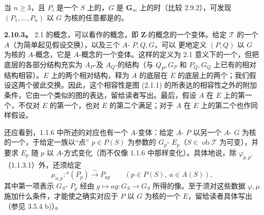 当 $n\geq3$，且 $P_i$ 是一个 $S$ 上的，$G$ 是 $\mathbf G_m$ 上的时（比较 2.9.2），可发现 $(P_1,\ldots,P_n)$ 以 $G$ 为核的任意都是的。

\textbf{2.10.3。} 2.1 的概念，可以看作的概念，即 $\mathbf Z$-的概念的一个变体。给定 $\mathcal T$ 的一个 $A$（为简单起见假设交换），以及三个 $A$- $P,Q,G$，可以
更地定义 $(P,Q)$ 以 $G$ 为核的 $A$-概念，它是 $A$-概念的一个变体。这样的定义为 2.1 意义下的一个，但把底层的各部分结构充实为 $A_P$-及 $A_Q$-的结构（与 $Q_P,G_P$ 和 $P_Q,G_Q$ 上已有的相对结构相容）。$E$ 上的两个相对结构，释为 $A$ 的底层在 $E$ 的底层上的两个；我们假设这两个彼此交换。因此，这个相容性是图 (2.1.1) 的所表达的相容性之外的附加条件，它由一个类似的图的表达，留给读者写出。最后，假设 $A$ 在 $E$ 上的第一个，不仅对 $E$ 的第一个，也对 $E$ 的第二个满足；对于 $A$ 在 $E$ 上的第二个也作同样假设。

还应看到，1.1.6 中所述的对应也有一个 $A$-变体：给定 $A$- $P$ 以另一个 $A$- $G$ 为核的一个，于给定一族以“点” $p\in P(S)$ 为参数的 $G_p$- $E_p$（$S\in\operatorname{ob}\mathcal T$ 为可变），并要求 $E_p$ 随 $p$ 以 $A$-方式变化（而不仅像 1.1.6 中那样变化）。具体地说，除 $\varphi_{p,p'}$（1.1.3.1）外，还须给定
\[
\mu_{a,p}:{}^a(P_p)\xrightarrow{\sim}P_{ap}\qquad(p\in P(S),\ a\in A(S)),
\]
其中第一项表示 $G_S$- $P_p$ 经由
$g\mapsto ag:G_S\to G_S$ 所得的像。至于须对这些数据 $\varphi,\mu$ 施加什么条件，才能使之确实对应于 $P$ 以 $G$ 为核的一个 $E$，留给读者具体写出（参见 3.5.4 b)）。
